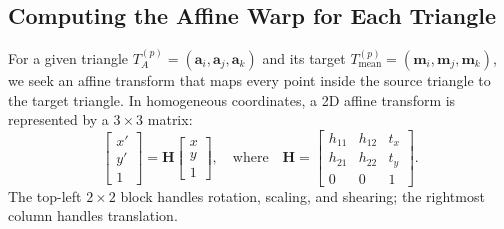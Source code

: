 \subsection{Computing the Affine Warp for Each Triangle}

For a given triangle $T_A^{(p)} = (\mathbf{a}_i, \mathbf{a}_j, \mathbf{a}_k)$ and its target $T_{\text{mean}}^{(p)} = (\mathbf{m}_i, \mathbf{m}_j, \mathbf{m}_k)$, we seek an affine transform that maps every point inside the source triangle to the target triangle. In homogeneous coordinates, a 2D affine transform is represented by a $3 \times 3$ matrix:
\begin{equation}
    \begin{bmatrix} x' \\ y' \\ 1 \end{bmatrix}
    =
    \mathbf{H}
    \begin{bmatrix} x \\ y \\ 1 \end{bmatrix},
    \quad \text{where} \quad
    \mathbf{H} =
    \begin{bmatrix}
        h_{11} & h_{12} & t_x \\
        h_{21} & h_{22} & t_y \\
        0 & 0 & 1
    \end{bmatrix}.
\end{equation}
The top-left $2 \times 2$ block handles rotation, scaling, and shearing; the rightmost column handles translation.

